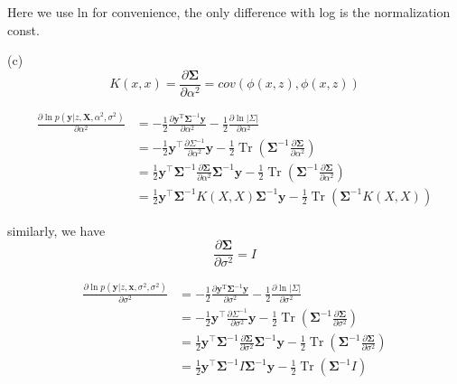 \documentclass[11pt]{article}
\newcommand{\mbf}[1]{{\boldsymbol{\mathbf{#1}}}}
\renewcommand{\bm}{\mbf}
\begin{document}
\begin{enumerate}
Here we use ln for convenience, the only difference with log is the normalization const.

(c)
\begin{equation}
    K(x,x) = \frac{\partial \mathbf{\Sigma}}{\partial \alpha^2} = cov(\phi{(x,z)}, \phi{(x,z)})
\end{equation}

\begin{align}
    \frac{\partial{\ln p(\bm{y} |z ,\bm{X}, \alpha^2, \sigma^2)}}{\partial{\alpha^2}} 
    &=  -\frac{1}{2} \frac{\partial{\mathbf{y}^{\mathrm{T}} \boldsymbol{\Sigma}^{-1}\mathbf{y}}}{\partial{\alpha^2}} - \frac{1}{2}\frac{\partial{\ln |\Sigma|}}{\partial{\alpha^2}}\\
    &=  -\frac{1}{2} \bm{y}^{\top} \frac{\partial{\Sigma^{-1}}}{\partial{\alpha^2}} \bm{y} - \frac{1}{2} \operatorname{Tr}\left(\mathbf{\Sigma}^{-1} \frac{\partial \mathbf{\Sigma}}{\partial \alpha^2}\right) \\
    &=  \frac{1}{2} \bm{y}^{\top} \mathbf{\Sigma}^{-1} \frac{\partial \mathbf{\Sigma}}{\partial \alpha^2} \mathbf{\Sigma}^{-1} \bm{y} - \frac{1}{2} \operatorname{Tr}\left(\mathbf{\Sigma}^{-1} \frac{\partial \mathbf{\Sigma}}{\partial \alpha^2}\right) \\
    &=  \frac{1}{2} \bm{y}^{\top} \mathbf{\Sigma}^{-1} K(X,X) \mathbf{\Sigma}^{-1} \bm{y} - \frac{1}{2} \operatorname{Tr}\left(\mathbf{\Sigma}^{-1} K(X,X)\right)
\end{align}

similarly, we have 
\begin{equation}
    \frac{\partial \mathbf{\Sigma}}{\partial \sigma^2} = I
\end{equation}

\begin{align}
    \frac{\partial{\ln p(\bm{y} |z ,\bm{x}, \sigma^2, \sigma^2)}}{\partial{\sigma^2}} 
    &=  -\frac{1}{2} \frac{\partial{\mathbf{y}^{\mathrm{T}} \boldsymbol{\Sigma}^{-1}\mathbf{y}}}{\partial{\sigma^2}} - \frac{1}{2}\frac{\partial{\ln |\Sigma|}}{\partial{\sigma^2}}\\
    &=  -\frac{1}{2} \bm{y}^{\top} \frac{\partial{\Sigma^{-1}}}{\partial{\sigma^2}} \bm{y} - \frac{1}{2} \operatorname{Tr}\left(\mathbf{\Sigma}^{-1} \frac{\partial \mathbf{\Sigma}}{\partial \sigma^2}\right) \\
    &=  \frac{1}{2} \bm{y}^{\top} \mathbf{\Sigma}^{-1} \frac{\partial \mathbf{\Sigma}}{\partial \sigma^2} \mathbf{\Sigma}^{-1} \bm{y} - \frac{1}{2} \operatorname{Tr}\left(\mathbf{\Sigma}^{-1} \frac{\partial \mathbf{\Sigma}}{\partial \sigma^2}\right) \\
    &=  \frac{1}{2} \bm{y}^{\top} \mathbf{\Sigma}^{-1} I \mathbf{\Sigma}^{-1} \bm{y} - \frac{1}{2} \operatorname{Tr}\left(\mathbf{\Sigma}^{-1} I\right)
\end{align}


\end{enumerate}
\end{document}
